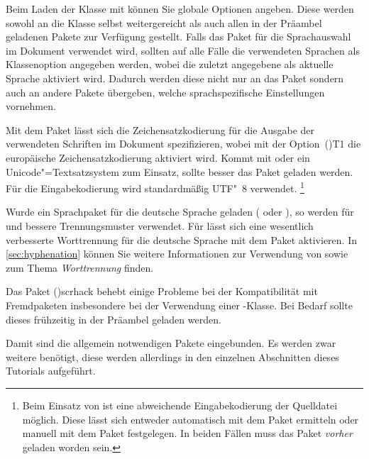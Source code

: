 \documentclass[%
  english,ngerman,%
  cdgeometry=no,DIV=12,%
  cd=false,cdfont=false,cdtitle=true,%
  headings=normal,%
  automark,%
  listof=toc,%
]{tudscrartcl}
\begin{document}
Beim Laden der Klasse mit  können Sie globale Optionen 
angeben. Diese werden sowohl an die Klasse selbst weitergereicht als auch allen 
in der Präambel geladenen Pakete zur Verfügung gestellt. Falls das Paket 
 für die Sprachauswahl im Dokument verwendet wird, sollten auf 
alle Fälle die verwendeten Sprachen als Klassenoption angegeben werden, wobei 
die zuletzt angegebene als aktuelle Sprache aktiviert wird. Dadurch werden 
diese nicht nur an das Paket  sondern auch an andere Pakete 
übergeben, welche sprachspezifische Einstellungen vornehmen.
%
%
Mit dem Paket  lässt sich die Zeichensatzkodierung für die 
Ausgabe der verwendeten Schriften im Dokument spezifizieren, wobei mit der 
Option~\Option(){T1} die europäische Zeichensatzkodierung 
aktiviert wird. Kommt mit  oder  ein 
Unicode"=Textsatzsystem zum Einsatz, sollte besser das Paket  
geladen werden. Für die Eingabekodierung wird standardmäßig UTF"~8 verwendet.%
\footnote{%
  Beim Einsatz von  ist eine abweichende Eingabekodierung der 
  Quelldatei möglich. Diese lässt sich entweder automatisch mit dem Paket 
   ermitteln oder manuell mit dem Paket  
  festgelegen. In beiden Fällen muss das Paket  \emph{vorher} 
  geladen worden sein.
} 

Wurde ein Sprachpaket für die deutsche Sprache geladen ( oder 
), so werden für  und  
bessere Trennungsmuster verwendet. Für  lässt sich eine 
wesentlich verbesserte Worttrennung für die deutsche Sprache mit dem Paket 
 aktivieren. In \autoref{sec:hyphenation} können Sie weitere 
Informationen zur Verwendung von  sowie zum Thema 
\emph{Worttrennung} finden.
%
\begin{Preamble}
\usepackage{iftex}
\iftutex
  \usepackage{fontspec}
\else
  \usepackage[T1]{fontenc}
  \usepackage[ngerman=ngerman-x-latest]{hyphsubst}
\fi
\end{Preamble}
%
Das Paket \Package(){scrhack} behebt einige Probleme bei 
der Kompatibilität mit Fremdpaketen insbesondere bei der Verwendung einer 
\KOMAScript-Klasse. Bei Bedarf sollte dieses frühzeitig in der Präambel geladen 
werden. 
%
\begin{Preamble}
\usepackage{scrhack}
\end{Preamble}
%
Damit sind die allgemein notwendigen Pakete eingebunden. Es werden zwar weitere 
benötigt, diese werden allerdings in den einzelnen Abschnitten dieses Tutorials 
aufgeführt.
\end{document}
